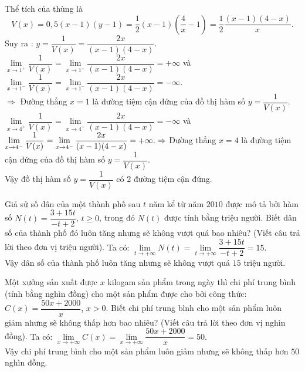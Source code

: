 \begin{bt}
{		Thể tích của thùng là $$V(x)=0{,}5(x-1)(y-1)=\dfrac{1}{2}(x-1)\left(\dfrac{4}{x}-1\right)=\dfrac{1}{2} \dfrac{(x-1)(4-x)}{x}.$$
		Suy ra : $y=\dfrac{1}{V(x)}=\dfrac{2 x}{(x-1)(4-x)}$.\\
		$\lim\limits _{x \rightarrow 1^{+}} \dfrac{1}{V(x)}=\lim\limits _{x \rightarrow 1^{+}} \dfrac{2 x}{(x-1)(4-x)}=+\infty$ và $\lim\limits _{x \rightarrow 1^{-}} \dfrac{1}{V(x)}=\lim\limits _{x \rightarrow 1^{-}} \dfrac{2 x}{(x-1)(4-x)}=-\infty$.\\
		$ \Rightarrow$ Đường thẳng $x=1$ là đường tiệm cận đứng của đồ thị hàm số $y=\dfrac{1}{V(x)}$.\\ 
		$\lim\limits _{x \rightarrow 4^{+}} \dfrac{1}{V(x)}=\lim\limits _{x \rightarrow 4^{+}} \dfrac{2 x}{(x-1)(4-x)}=-\infty$ và $\lim\limits _{x \rightarrow 4^{-}} \dfrac{1}{V(x)}=\lim\limits _{x \rightarrow 4^{-}} \dfrac{2 x}{(x-1)(4-x)}=+\infty.\\ \Rightarrow$ Đường thẳng $x=4$ là đường tiệm cận đứng của đồ thị hàm số $y=\dfrac{1}{V(x)}$.\\
		Vậy đồ thị hàm số $y=\dfrac{1}{V(x)}$ có 2 đường tiệm cận đứng.
	}
\end{bt}

\begin{bt}%
	Giả sử số dân của một thành phố sau $t$ năm kể từ năm $2010$ được mô tả bởi hàm số $N(t)=\dfrac{3+15t}{-t+2}$, $t\geq 0$, trong đó $N(t)$ được tính bằng triệu người. Biết dân số của thành phố đó luôn tăng nhưng sẽ không vượt quá bao nhiêu? (Viết câu trả lời theo đơn vị triệu người).
	\loigiai
	{Ta có: $\lim\limits_{t\to +\infty} N(t)=\lim\limits_{t\to +\infty}\dfrac{3+15t}{-t+2}=15$.\\
		Vậy dân số của thành phố luôn tăng nhưng sẽ không vượt quá $15$ triệu người.
	}
\end{bt}

\begin{bt}%
	Một xưởng sản xuất được $x$ kilogam sản phẩm trong ngày thì chi phí trung bình (tính bằng nghìn đồng) cho một sản phẩm được cho bởi công thức: $C(x)=\dfrac{50x+2000}{x}$, $x>0$. Biết chi phí trung bình cho một sản phẩm luôn giảm nhưng sẽ không thấp hơn bao nhiêu? (Viết câu trả lời theo đơn vị nghìn đồng).
	\loigiai
	{Ta có: $\lim\limits_{x\to +\infty} C(x)=\lim\limits_{x\to +\infty}\dfrac{50x+2000}{x}=50$.\\
		Vậy chi phí trung bình cho một sản phẩm luôn giảm nhưng sẽ không thấp hơn $50$ nghìn đồng.
	}
\end{bt}

